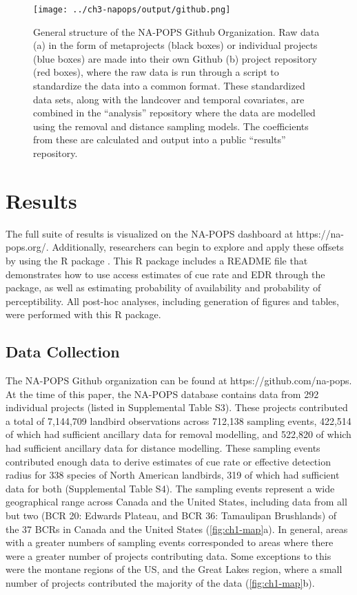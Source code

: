 \begin{figure}[h]
	\centering
	\texttt{[image: ../ch3-napops/output/github.png]}
	\caption{\label{fig:github}General structure of the NA-POPS Github Organization.  Raw data (a) in the form of metaprojects (black boxes) or individual projects (blue boxes) are made into their own Github (b) project repository (red boxes), where the raw data is run through a script to standardize the data into a common format. These standardized data sets, along with the landcover and temporal covariates, are combined in the “analysis” repository where the data are modelled using the removal and distance sampling models. The coefficients from these are calculated and output into a public “results” repository.}
\end{figure}

\section{Results}

The full suite of results is visualized on the NA-POPS dashboard at https://na-pops.org/. Additionally, researchers can begin to explore and apply these offsets by using the R package  \citep{edwards_napops_2024}. This R package includes a README file that demonstrates how to use access estimates of cue rate and EDR through the package, as well as estimating probability of availability and probability of perceptibility. All post-hoc analyses, including generation of figures and tables, were performed with this R package. 

\subsection{Data Collection}
\par The NA-POPS Github organization can be found at https://github.com/na-pops. At the time of this paper, the NA-POPS database contains data from 292 individual projects (listed in Supplemental Table S3). These projects contributed a total of 7,144,709 landbird observations across 712,138 sampling events, 422,514 of which had sufficient ancillary data for removal modelling, and 522,820 of which had sufficient ancillary data for distance modelling. These sampling events contributed enough data to derive estimates of cue rate or effective detection radius for 338 species of North American landbirds, 319 of which had sufficient data for both (Supplemental Table S4). The sampling events represent a wide geographical range across Canada and the United States, including data from all but two (BCR 20: Edwards Plateau, and BCR 36: Tamaulipan Brushlands) of the 37 BCRs in Canada and the United States (\autoref{fig:ch1-map}a). In general, areas with a greater numbers of sampling events corresponded to areas where there were a greater number of projects contributing data. Some exceptions to this were the montane regions of the US, and the Great Lakes region, where a small number of projects contributed the majority of the data (\autoref{fig:ch1-map}b).

